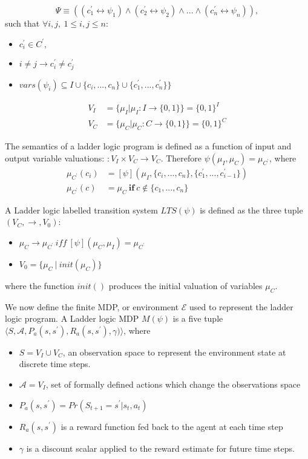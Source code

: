 \documentclass[runningheads]{llncs}
\begin{document}
\begin{equation}
	\Psi \equiv ((c^\prime_1 \leftrightarrow \psi_1) \land(c^\prime_2 \leftrightarrow \psi_2) \land ... \land (c_n^\prime \leftrightarrow \psi_n)), 
\end{equation}   
such that $\forall i,j,  \ 1 \leq i,j \leq n:$
 \begin{itemize}
	\item $c^{\prime}_i \in C^\prime,$
	\item $ i \neq j \to c^\prime_i \neq c^\prime_j$
	\item $vars(\psi_i) \subseteq I \cup \{c_i, ...,c_n\} \cup \{c^\prime_1, ..., c^\prime_n\} \}$
\end{itemize} 
\begin{align}
	V_I & = \{\mu_I | \mu_I : I \to \{0,1\}\} = \{0,1\}^I \\
	V_C & = \{\mu_C | \mu_C : C \to \{0,1\}\} = \{0,1\}^C 
\end{align}

The semantics of a ladder logic program is defined as a function of input and output variable valuations:
\begin{math}
	[\psi] : V_I \times V_C \to V_C
\end{math}. Therefore $\psi(\mu_I, \mu_C) = \mu_{C^\prime}$, where
\begin{align}
	\mu_{C^\prime}(c_i) & = [\psi](\mu_I, \{c_i,...,c_n\}, \{c^\prime_1,...,c^\prime_{i-1}\}) \\
	\mu_{C^\prime}(c) & = \mu_C \ \mathbf{if} \ c \notin \{c_1,...,c_n\} 
\end{align} 

A Ladder logic labelled transition system $LTS(\psi)$ is defined as the three tuple $(V_C, \to, V_0)$:
\begin{itemize}
	\item $\mu_C \to \mu_{C^\prime} \ \textit{iff} \ [\psi](\mu_C,\mu_I)=\mu_{C^\prime}$
	\item $V_0 = \{\mu_C \ | \ init(\mu_C)\}$
\end{itemize} 
where the function $init()$ produces the initial valuation of variables $\mu_C$.


We now define the finite MDP, or environment $\mathcal{E}$ used to represent the ladder logic program. A Ladder logic MDP $M(\psi)$ is a five tuple $\langle S,\mathcal{A},P_a(s,s^\prime), R_a(s,s^\prime),\gamma) \rangle$, where 
\begin{itemize}
	\item $S = V_I \cup V_C$, an observation space to represent the environment state at discrete time steps.
	\item $\mathcal{A} = V_I$, set of formally defined actions which change the observations space
	\item $P_a(s,s^\prime) = Pr(S_{t+1} = s^\prime | s_t, a_t)$
	\item $R_a(s,s^\prime)$ is a reward function fed back to the agent at each time step
	\item $\gamma$ is a discount scalar applied to the reward estimate for future time steps.
\end{itemize}
\end{document}
